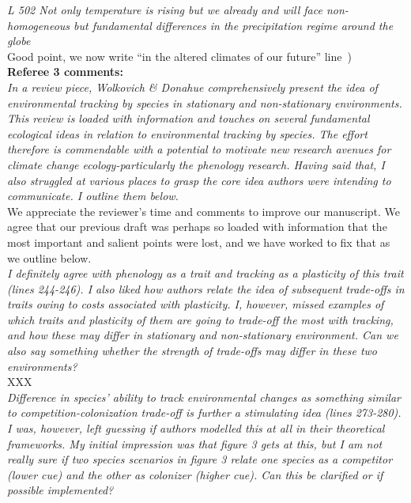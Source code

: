 \documentclass[11pt]{article}
\newcommand{\lr}[1]{line~\lineref{#1}}
\begin{document}
\emph{L 502 Not only temperature is rising but we already and will face non-homogeneous but
fundamental differences in the precipitation regime around the globe}\\

Good point, we now write ``in the altered climates of our future'' \lr{r2precip3})\\


{\bf Referee 3 comments:} \\

\emph{In a review piece, Wolkovich \& Donahue comprehensively present the idea of environmental
tracking by species in stationary and non-stationary environments. This review is loaded with
information and touches on several fundamental ecological ideas in relation to environmental
tracking by species. The effort therefore is commendable with a potential to motivate new
research avenues for climate change ecology-particularly the phenology research. Having said
that, I also struggled at various places to grasp the core idea authors were intending to
communicate. I outline them below.}\\

We appreciate the reviewer's time and comments to improve our manuscript. We agree that our previous draft was perhaps so loaded with information that the most important and salient points were lost, and we have worked to fix that as we outline below.\\

\emph{I definitely agree with phenology as a trait and tracking as a plasticity of this trait
(lines 244-246). I also liked how authors relate the idea of subsequent trade-offs in traits
owing to costs associated with plasticity. I, however, missed examples of which traits and
plasticity of them are going to trade-off the most with tracking, and how these may differ in
stationary and non-stationary environment. Can we also say something whether the strength of
trade-offs may differ in these two environments?}\\

XXX\\

\emph{Difference in species’ ability to track environmental changes as something similar to
competition-colonization trade-off is further a stimulating idea (lines 273-280). I was,
however, left guessing if authors modelled this at all in their theoretical frameworks. My
initial impression was that figure 3 gets at this, but I am not really sure if two species
scenarios in figure 3 relate one species as a competitor (lower cue) and the other as
colonizer (higher cue). Can this be clarified or if possible implemented?}\\
\end{document}

